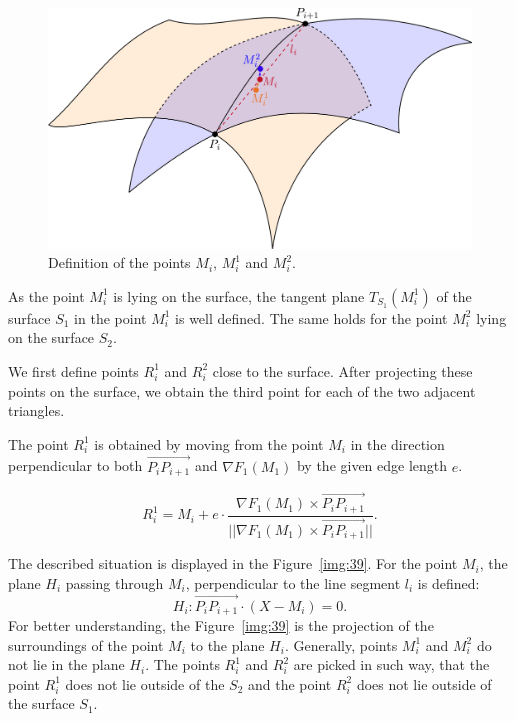 \begin{figure}[h!]
    \centerline{\includegraphics[scale=0.5]{images/img38}}
    \caption[Definition of the points]
    {Definition of the points $M_i$, $M_i^1$ and $M_i^2$.}
    \label{img:38}
\end{figure}

As the point $M_i^1$ is lying on the surface, the tangent plane $T_{S_1}(M_i^1)$ 
of the surface $S_1$ in the point $M_i^1$ is well defined. The same holds for the 
point $M_i^2$ lying on the surface $S_2$. 

We first define points $R_i^1$ and $R_i^2$ close to the surface. After projecting
these points on the surface, we obtain the third point for each of the two 
adjacent triangles.

The point $R_i^1$ is obtained by moving from the point $M_i$ in the direction 
perpendicular to both $\overrightarrow{P_{i} P_{i+1}}$ and 
$\nabla{F_1}(M_1)$ by the given edge length $e$.

$$R_i^1 = M_i + e \cdot \frac{\nabla{F_1}(M_1) \times \overrightarrow{P_{i} P_{i+1}}}{||\nabla{F_1}(M_1) \times \overrightarrow{P_i P_{i+1}}||}.$$

The described situation is displayed in the Figure~\ref{img:39}.
For the point $M_i$, the plane $H_i$ passing through $M_i$, perpendicular to the
line segment $l_i$ is defined:
$$H_i : \overrightarrow{P_i P_{i+1}} \cdot (X-M_i) = 0.$$
For better understanding, the Figure~\ref{img:39} is the projection of the surroundings
of the point $M_i$ to the plane $H_i$. Generally, points $M_i^1$ and $M_i^2$ do not lie in
the plane $H_i$. The points $R_i^1$ and $R_i^2$ are picked in such way, that the point
$R_i^1$ does not lie outside of the $S_2$ and the point $R_i^2$ does not lie outside of 
the surface $S_1$.

